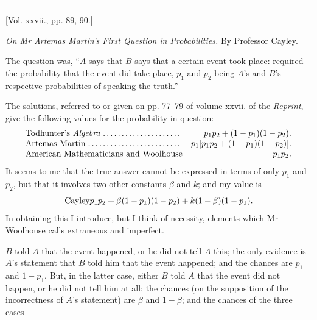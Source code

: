 \documentclass[10pt,twoside]{article}
\begin{document}
\begin{center}
\rule{0.32\linewidth}{0.4pt}

[Vol. xxvii., pp. 89, 90.]
\end{center}

\begin{center}
\textit{On Mr Artemas Martin's First Question in Probabilities.}\quad
By Professor Cayley.
\end{center}

The question was, ``\(A\) says that \(B\) says that a certain event took place:
required the probability that the event did take place, \(p_1\) and \(p_2\)
being \(A\)'s and \(B\)'s respective probabilities of speaking the truth.''

The solutions, referred to or given on pp. 77--79 of volume xxvii. of the
\textit{Reprint}, give the following values for the probability in question:---
\[
\begin{array}{lr}
\hbox{Todhunter's \textit{Algebra}}\dotfill&
 p_1p_2+(1-p_1)(1-p_2).\\
\hbox{Artemas Martin}\dotfill&
 p_1[p_1p_2+(1-p_1)(1-p_2)].\\
\hbox{American Mathematicians and Woolhouse}\dotfill&
 p_1p_2.
\end{array}
\]
It seems to me that the true answer cannot be expressed in terms of only
\(p_1\) and \(p_2\), but that it involves two other constants \(\beta\) and
\(k\); and my value is---
\[
\hbox{Cayley}\dotfill
p_1p_2+\beta(1-p_1)(1-p_2)+k(1-\beta)(1-p_1).
\]
In obtaining this I introduce, but I think of necessity, elements which Mr
Woolhouse calls extraneous and imperfect.

\(B\) told \(A\) that the event happened, or he did not tell \(A\) this; the
only evidence is \(A\)'s statement that \(B\) told him that the event happened;
and the chances are \(p_1\) and \(1-p_1\). But, in the latter case, either
\(B\) told \(A\) that the event did not happen, or he did not tell him at all;
the chances (on the supposition of the incorrectness of \(A\)'s statement) are
\(\beta\) and \(1-\beta\); and the chances of the three cases
\end{document}
